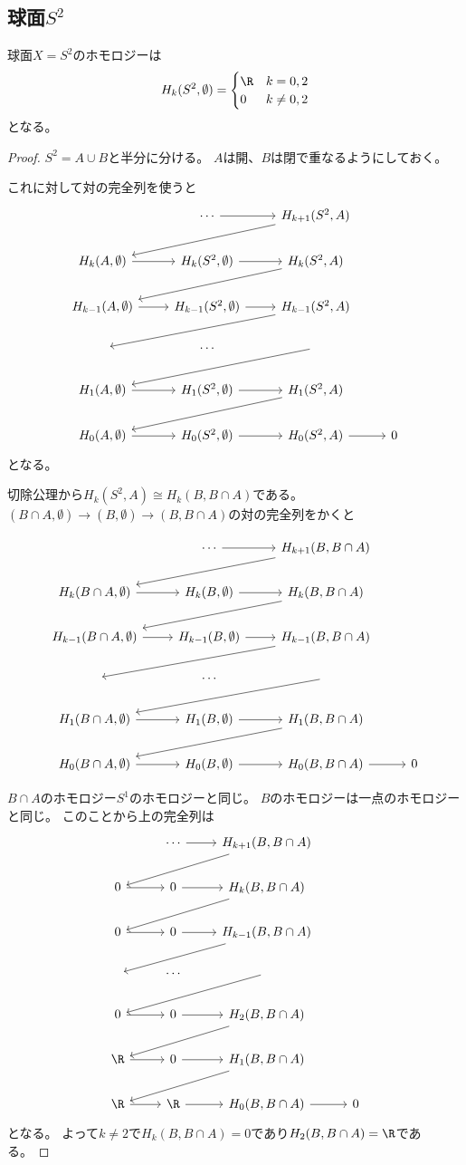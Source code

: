 \documentclass{jsarticle}
\begin{document}
\subsection{球面$S^2$}
\begin{prop}
球面$X=S^2$のホモロジーは
\[
H_k(S^2,\emptyset)=\begin{cases}\R&k=0,2\\0&k\neq 0,2\end{cases}
\]
となる。
\end{prop}
\begin{proof}
$S^2=A\cup B$と半分に分ける。
$A$は開、$B$は閉で重なるようにしておく。

これに対して対の完全列を使うと
\[
\begin{tikzcd}
~ &\cdots \ar[r] &H_{k+1}(S^2,A) \ar[dll]\\
H_k(A,\emptyset) \ar[r] &H_k(S^2,\emptyset) \ar[r] &H_k(S^2,A) \ar[dll]\\
H_{k-1}(A,\emptyset) \ar[r] &H_{k-1}(S^2,\emptyset) \ar[r] &H_{k-1}(S^2,A) \ar[dll]\\
~&\cdots&\ar[dll]\\
H_{1}(A,\emptyset) \ar[r] &H_{1}(S^2,\emptyset) \ar[r] &H_{1}(S^2,A) \ar[dll]\\
H_{0}(A,\emptyset) \ar[r] &H_{0}(S^2,\emptyset) \ar[r] &H_{0}(S^2,A) \ar[r]&0
\end{tikzcd}
\]
となる。

切除公理から$H_k(S^2,A)\cong H_k(B,B\cap A)$である。
$(B\cap A,\emptyset)\to(B,\emptyset)\to(B,B\cap A)$の対の完全列をかくと

\[
\begin{tikzcd}
~ &\cdots \ar[r] &H_{k+1}(B,B\cap A) \ar[dll]\\
H_k(B\cap A,\emptyset) \ar[r] &H_k(B,\emptyset) \ar[r] &H_k(B,B\cap A) \ar[dll]\\
H_{k-1}(B\cap A,\emptyset) \ar[r] &H_{k-1}(B,\emptyset) \ar[r] &H_{k-1}(B,B\cap A) \ar[dll]\\
~&\cdots&\ar[dll]\\
H_{1}(B\cap A,\emptyset) \ar[r] &H_{1}(B,\emptyset) \ar[r] &H_{1}(B,B\cap A) \ar[dll]\\
H_{0}(B\cap A,\emptyset) \ar[r] &H_{0}(B,\emptyset) \ar[r] &H_{0}(B,B\cap A) \ar[r]&0
\end{tikzcd}
\]

$B\cap A$のホモロジー$S^1$のホモロジーと同じ。
$B$のホモロジーは一点のホモロジーと同じ。
このことから上の完全列は
\[
\begin{tikzcd}
~ &\cdots \ar[r] &H_{k+1}(B,B\cap A) \ar[dll]\\
0 \ar[r] &0 \ar[r] &H_k(B,B\cap A) \ar[dll]\\
0 \ar[r] &0 \ar[r] &H_{k-1}(B,B\cap A) \ar[dll]\\
~&\cdots&\ar[dll]\\
0 \ar[r] &0 \ar[r] &H_{2}(B,B\cap A) \ar[dll]\\
\R \ar[r] &0 \ar[r] &H_{1}(B,B\cap A) \ar[dll]\\
\R \ar[r] &\R \ar[r] &H_{0}(B,B\cap A) \ar[r]&0
\end{tikzcd}
\]
となる。
よって$k\neq 2$で$H_k(B,B\cap A)=0$であり$H_2(B,B\cap A)=\R$である。


\end{proof}
\end{document}
